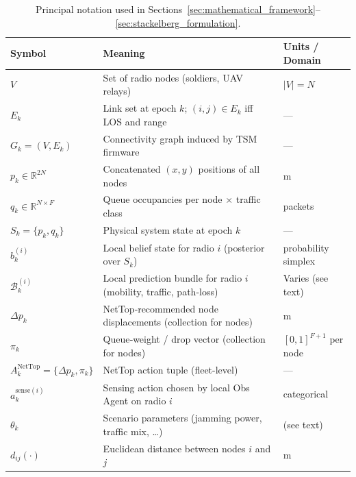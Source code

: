\documentclass[doc.tex]{subfiles}
\begin{document}
\clearpage
\begin{table}[htbp]
\caption{Principal notation used in Sections~\ref{sec:mathematical_framework}–\ref{sec:stackelberg_formulation}.}
\centering
\renewcommand{\arraystretch}{1.15} %
\begin{tabularx}{\linewidth}{@{}>{\raggedright\arraybackslash}p{3.2cm}%
                                 X%
                                 >{\raggedright\arraybackslash}p{3.6cm}@{}}%
\toprule
\textbf{Symbol} & \textbf{Meaning} & \textbf{Units / Domain} \\
\midrule
$V$                     & Set of radio nodes (soldiers, UAV relays)             & $\lvert V\rvert=N$ \\
$E_k$                   & Link set at epoch $k$; $(i,j)\!\in\!E_k$ iff LOS and range & — \\
$G_k=(V,E_k)$           & Connectivity graph induced by TSM firmware            & — \\
$p_k\in\mathbb{R}^{2N}$ & Concatenated $(x,y)$ positions of all nodes           & m \\
$q_k\in\mathbb{R}^{N\times F}$ & Queue occupancies per node $\times$ traffic class & packets \\
$S_k=\{p_k,q_k\}$       & Physical system state at epoch $k$                    & — \\
$b_k^{(i)}$             & Local belief state for radio $i$ (posterior over $S_k$) & probability simplex \\
$\mathcal{B}_k^{(i)}$   & Local prediction bundle for radio $i$ (mobility, traffic, path-loss) & Varies (see text) \\
$\Delta p_k$            & NetTop‑recommended node displacements (collection for nodes) & m \\
$\pi_k$                 & Queue‑weight / drop vector (collection for nodes)     & $[0,1]^{F+1}$ per node \\
$A_k^{\text{NetTop}}=\{\Delta p_k,\pi_k\}$ & NetTop action tuple (fleet-level)   & — \\
$a^{\text{sense}(i)}_k$ & Sensing action chosen by local Obs Agent on radio $i$ & categorical \\
$\theta_k$              & Scenario parameters (jamming power, traffic mix, …)   & (see text) \\
$d_{ij}(\cdot)$         & Euclidean distance between nodes $i$ and $j$          & m \\

\end{tabularx}
\end{table}
\end{document}
